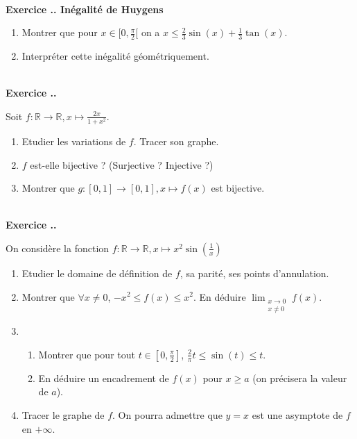 \documentclass{article}
\newcommand{\mb}[1]{\mathbb{#1}}
\newcounter{exo}
\newcommand{\exercice}[1][\null]{\textbf{\\ \large Exercice \thesection.\theexo. \normalsize #1} \addtocounter{exo}{1}}
\begin{document}
\exercice[Inégalité de Huygens]

\begin{enumerate}

\item Montrer que pour $x \in [0, \frac{\pi}{2}[$ on a $x \le \frac{2}{3} \sin(x) + \frac{1}{3} \tan(x) $.

\item Interpréter cette inégalité géométriquement.

\end{enumerate}


\exercice 

Soit $f : \mb{R} \rightarrow \mb{R}, x \mapsto \frac{2x}{1+x^2}$.
\begin{enumerate}
\item Etudier les variations de $f$. Tracer son graphe.

\item $f$ est-elle bijective ? (Surjective ? Injective ?)

\item Montrer que $g : [0,1] \rightarrow [0,1], x \mapsto f(x)$ est bijective.
\end{enumerate}




\exercice

On considère la fonction $f : \mb{R} \rightarrow \mb{R}, x \mapsto x^2 \sin(\frac{1}{x})$

\begin{enumerate}

\item Etudier le domaine de définition de $f$, sa parité, ses points d'annulation.

\item Montrer que $\forall x \neq 0$, $-x^2 \le f(x) \le x^2$. En déduire $\displaystyle \lim_{\substack{x \rightarrow 0\\x \neq 0}} f(x)$.

\item \begin{enumerate}

\item Montrer que pour tout $t\in [0,\frac{\pi}{2}]$, $\frac{2}{\pi}t \le \sin(t) \le t$.

\item En déduire un encadrement de $f(x)$ pour $x \ge a$ (on précisera la valeur de $a$).

\end{enumerate}

\item Tracer le graphe de $f$. On pourra admettre que $y =x$ est une asymptote de $f$ en $+ \infty$.
\end{enumerate}
\end{document}

